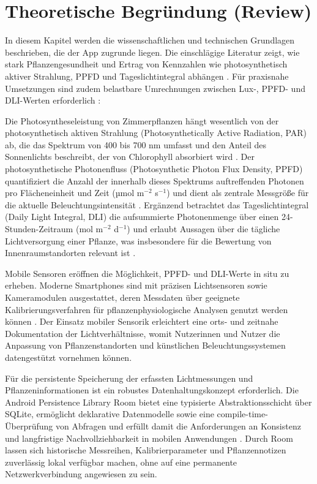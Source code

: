 \documentclass[14pt,a4paper]{report}
\begin{document}
\chapter{Theoretische Begründung (Review)}
In diesem Kapitel werden die wissenschaftlichen und technischen Grundlagen beschrieben, die der App zugrunde liegen. Die einschlägige Literatur zeigt, wie stark Pflanzengesundheit und Ertrag von Kennzahlen wie photosynthetisch aktiver Strahlung, PPFD und Tageslichtintegral abhängen \cite{gavhane2023dli,xu2021nasturtium,ke2023tomato,yamashita2019ppfd}. Für praxisnahe Umsetzungen sind zudem belastbare Umrechnungen zwischen Lux-, PPFD- und DLI-Werten erforderlich \cite{wikipedia2024dli,hlg2024ppfd}:

Die Photosyntheseleistung von Zimmerpflanzen hängt wesentlich von der photosynthetisch aktiven Strahlung (Photosynthetically Active Radiation, PAR) ab, die das Spektrum von 400 bis 700 nm umfasst und den Anteil des Sonnenlichts beschreibt, der von Chlorophyll absorbiert wird \cite{McCree1972}. Der photosynthetische Photonenfluss (Photosynthetic Photon Flux Density, PPFD) quantifiziert die Anzahl der innerhalb dieses Spektrums auftreffenden Photonen pro Flächeneinheit und Zeit (µmol m$^{-2}$ s$^{-1}$) und dient als zentrale Messgröße für die aktuelle Beleuchtungsintensität \cite{NelsonBugbee2015}. Ergänzend betrachtet das Tageslichtintegral (Daily Light Integral, DLI) die aufsummierte Photonenmenge über einen 24-Stunden-Zeitraum (mol m$^{-2}$ d$^{-1}$) und erlaubt Aussagen über die tägliche Lichtversorgung einer Pflanze, was insbesondere für die Bewertung von Innenraumstandorten relevant ist \cite{FaustLogan2018}.

Mobile Sensoren eröffnen die Möglichkeit, PPFD- und DLI-Werte in situ zu erheben. Moderne Smartphones sind mit präzisen Lichtsensoren sowie Kameramodulen ausgestattet, deren Messdaten über geeignete Kalibrierungsverfahren für pflanzenphysiologische Analysen genutzt werden können \cite{Petersen2021}. Der Einsatz mobiler Sensorik erleichtert eine orts- und zeitnahe Dokumentation der Lichtverhältnisse, womit Nutzerinnen und Nutzer die Anpassung von Pflanzenstandorten und künstlichen Beleuchtungssystemen datengestützt vornehmen können.

Für die persistente Speicherung der erfassten Lichtmessungen und Pflanzeninformationen ist ein robustes Datenhaltungskonzept erforderlich. Die Android Persistence Library Room bietet eine typisierte Abstraktionsschicht über SQLite, ermöglicht deklarative Datenmodelle sowie eine compile-time-Überprüfung von Abfragen und erfüllt damit die Anforderungen an Konsistenz und langfristige Nachvollziehbarkeit in mobilen Anwendungen \cite{AndroidRoom}. Durch Room lassen sich historische Messreihen, Kalibrierparameter und Pflanzennotizen zuverlässig lokal verfügbar machen, ohne auf eine permanente Netzwerkverbindung angewiesen zu sein.
\end{document}
